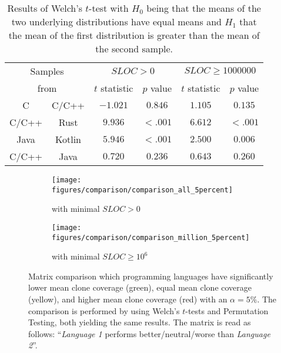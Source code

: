 \begin{table}[tbh!]
	\centering
	\begin{tabular}{|cc||c|c||c|c|}
		\hline
		\multicolumn{2}{|c||}{Samples} & \multicolumn{2}{c||}{$SLOC > 0$} & \multicolumn{2}{c|}{$SLOC \geq 1000000$}  \\
		\multicolumn{2}{|c||}{from} & \multicolumn{1}{c}{$t$ statistic} & \multicolumn{1}{c||}{$p$ value} & \multicolumn{1}{c}{$t$ statistic} & $p$ value \\
		\hline
		\hline
		C & C/C++ & $-1.021$ & $0.846$ & $1.105$ & $0.135$ \\
		\hline
		\hline
		C/C++ & Rust & $9.936$ & $<.001$ & $6.612$ & $<.001$ \\
		\hline
		Java & Kotlin & $5.946$ & $<.001$ & $2.500$ & $0.006$ \\
		\hline
		\hline
		C/C++ & Java & $0.720$ & $0.236$ & $0.643$ & $0.260$ \\
		\hline
	\end{tabular}
	\caption{Results of Welch's $t$-test with $H_0$ being that the means of the two underlying distributions have equal means and $H_1$ that the mean of the first distribution is greater than the mean of the second sample.}
	\label{tab:stat_test}
\end{table}

\begin{figure}[tbh!]
	\centering
	\begin{subfigure}[t]{0.49\textwidth}
		\texttt{[image: figures/comparison/comparison\_all\_5percent]}
		\caption{with minimal $SLOC > 0$}
		\label{fig:matrix_comp_all}
	\end{subfigure}
	\hfill
	\begin{subfigure}[t]{0.49\textwidth}
		\texttt{[image: figures/comparison/comparison\_million\_5percent]}
		\caption{with minimal $SLOC \geq 10^{6}$}
		\label{fig:matrix_comp_million}
	\end{subfigure}
	\caption{Matrix comparison which programming languages have significantly lower mean clone coverage (green), equal mean clone coverage (yellow), and higher mean clone coverage (red) with an $\alpha=5\%$. The comparison is performed by using Welch's $t$-tests and Permutation Testing, both yielding the same results. The matrix is read as follows: ``\textit{Language 1} performs better/neutral/worse than \textit{Language 2}''.}
	\label{fig:matrix_comp}
\end{figure}

